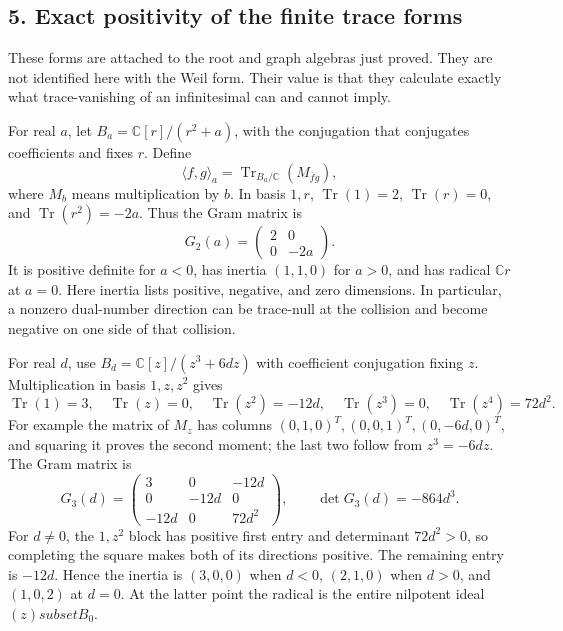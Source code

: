 \documentclass[
  10pt,
  a4paper,
]{article}
\begin{document}
\subsection{5. Exact positivity of the finite trace
forms}\label{exact-positivity-of-the-finite-trace-forms}

These forms are attached to the root and graph algebras just proved.
They are not identified here with the Weil form. Their value is that
they calculate exactly what trace-vanishing of an infinitesimal can and
cannot imply.

For real \(a\), let \(B_a=\mathbb C[r]/(r^2+a)\), with the conjugation
that conjugates coefficients and fixes \(r\). Define \[
\langle f,g\rangle_a=
\operatorname{Tr}_{B_a/\mathbb C}(M_{\overline f g}),
\tag{EFI36}
\] where \(M_b\) means multiplication by \(b\). In basis \(1,r\),
\(\operatorname{Tr}(1)=2\), \(\operatorname{Tr}(r)=0\), and
\(\operatorname{Tr}(r^2)=-2a\). Thus the Gram matrix is \[
G_2(a)=\begin{pmatrix}2&0\\0&-2a\end{pmatrix}.
\tag{EFI37}
\] It is positive definite for \(a<0\), has inertia \((1,1,0)\) for
\(a>0\), and has radical \(\mathbb C r\) at \(a=0\). Here inertia lists
positive, negative, and zero dimensions. In particular, a nonzero
dual-number direction can be trace-null at the collision and become
negative on one side of that collision.

For real \(d\), use \(B_d=\mathbb C[z]/(z^3+6dz)\) with coefficient
conjugation fixing \(z\). Multiplication in basis \(1,z,z^2\) gives \[
\operatorname{Tr}(1)=3,\quad
\operatorname{Tr}(z)=0,\quad
\operatorname{Tr}(z^2)=-12d,\quad
\operatorname{Tr}(z^3)=0,\quad
\operatorname{Tr}(z^4)=72d^2.
\tag{EFI38}
\] For example the matrix of \(M_z\) has columns
\((0,1,0)^T,(0,0,1)^T,(0,-6d,0)^T\), and squaring it proves the second
moment; the last two follow from \(z^3=-6dz\). The Gram matrix is \[
G_3(d)=
\begin{pmatrix}
3&0&-12d\\0&-12d&0\\-12d&0&72d^2
\end{pmatrix},
\qquad \det G_3(d)=-864d^3.
\tag{EFI39}
\] For \(d\ne0\), the \(1,z^2\) block has positive first entry and
determinant \(72d^2>0\), so completing the square makes both of its
directions positive. The remaining entry is \(-12d\). Hence the inertia
is \((3,0,0)\) when \(d<0\), \((2,1,0)\) when \(d>0\), and \((1,0,2)\)
at \(d=0\). At the latter point the radical is the entire nilpotent
ideal \((z)subset B_0\).
\end{document}
